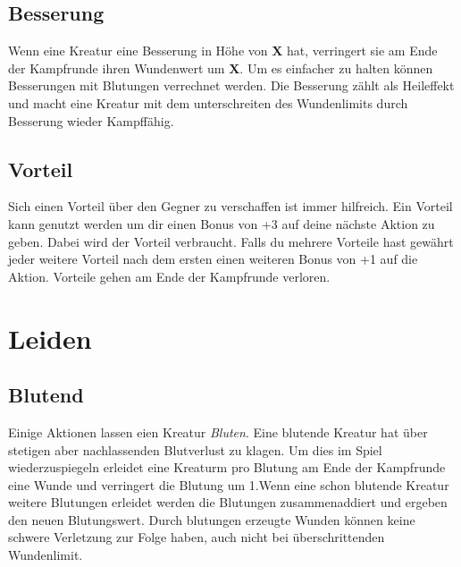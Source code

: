 \subsection*{Besserung} \label{ef:besserung}
Wenn eine Kreatur eine Besserung in Höhe von \textbf{X} hat, verringert sie am Ende der Kampfrunde ihren Wundenwert um \textbf{X}. Um es einfacher zu halten können Besserungen mit Blutungen verrechnet werden. Die Besserung zählt als Heileffekt und macht eine Kreatur mit dem unterschreiten des Wundenlimits durch Besserung wieder Kampffähig. 

\subsection*{Vorteil} \label{ef:vorteil}
Sich einen Vorteil über den Gegner zu verschaffen ist immer hilfreich.
Ein Vorteil kann genutzt werden um dir einen Bonus von +3 auf deine nächste Aktion zu geben. Dabei wird der Vorteil verbraucht. Falls du mehrere Vorteile hast gewährt jeder weitere Vorteil nach dem ersten einen weiteren Bonus von +1 auf die Aktion. Vorteile gehen am Ende der Kampfrunde verloren.


\section{Leiden}

\subsection*{Blutend} \label{ef:blutend}
Einige Aktionen lassen eien Kreatur \textit{Bluten}. Eine blutende Kreatur hat über stetigen aber nachlassenden Blutverlust zu klagen. Um dies im Spiel wiederzuspiegeln erleidet eine Kreaturm pro Blutung am Ende der Kampfrunde eine Wunde und verringert die Blutung um 1.Wenn eine schon blutende Kreatur weitere Blutungen erleidet werden die Blutungen zusammenaddiert und ergeben den neuen Blutungswert. Durch blutungen erzeugte Wunden können keine schwere Verletzung zur Folge haben, auch nicht bei überschrittenden Wundenlimit.  

